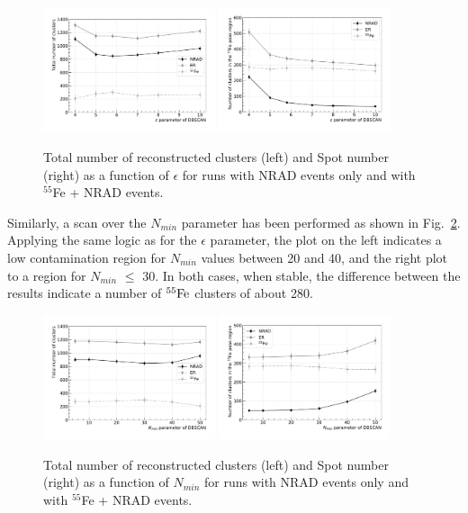 \documentclass[a4paper,11pt]{article}
\begin{document}
\begin{figure}[ht]
\centering
\includegraphics[width=0.45\textwidth]{TotalEpsScan.pdf}
\includegraphics[width=0.45\textwidth]{SpotEpsScan.pdf}
\caption{Total number of reconstructed clusters (left) and Spot number (right) as a function of $\epsilon$ for runs with NRAD events only and with $^{55}$Fe + NRAD events.}
\label{fig:epsscan}
\end{figure}


Similarly, a scan over the $N_{min}$ parameter has been performed as shown in Fig.~\ref{fig:minscan}. Applying the same logic as for the $\epsilon$ parameter, the plot on the left indicates a low contamination region for $N_{min}$ values between 20 and 40, and the right plot to a region for $N_{min}$ $\leq$ 30. In both cases, when stable, the difference between the results indicate a number of $\rm ^{55}Fe$ clusters of about 280. %


\begin{figure}[ht]
\centering
\includegraphics[width=0.45\textwidth]{TotalMinScan.pdf}
\includegraphics[width=0.45\textwidth]{SpotMinScan.pdf}
\caption{Total number of reconstructed clusters (left) and Spot number (right) as a function of $N_{min}$ for runs with NRAD events only and with $^{55}$Fe + NRAD events.}
\label{fig:minscan}
\end{figure}
\end{document}
